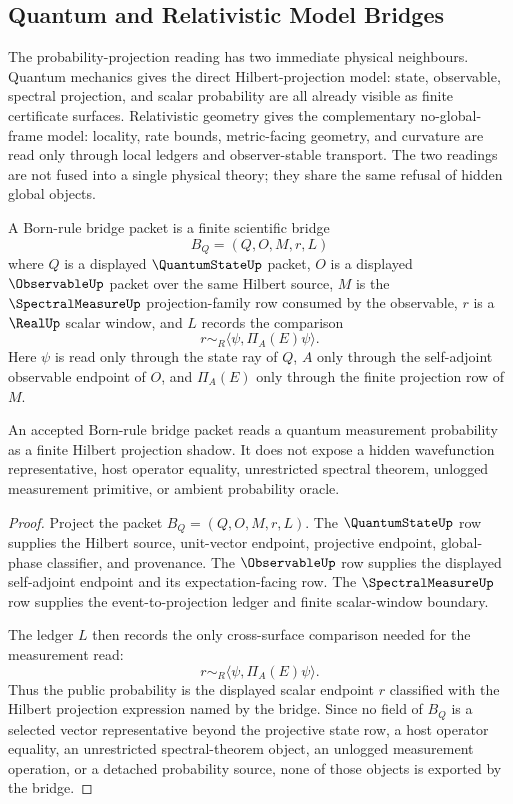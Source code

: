 \subsection{Quantum and Relativistic Model Bridges}
\label{subsec:philosophy-quantum-relativistic-model-bridge}

The probability-projection reading has two immediate physical neighbours.
Quantum mechanics gives the direct Hilbert-projection model: state, observable,
spectral projection, and scalar probability are all already visible as finite
certificate surfaces. Relativistic geometry gives the complementary
no-global-frame model: locality, rate bounds, metric-facing geometry, and
curvature are read only through local ledgers and observer-stable transport.
The two readings are not fused into a single physical theory; they share the
same refusal of hidden global objects.

\begin{definition}
\label{def:philosophy-born-rule-bridge-packet}
A Born-rule bridge packet is a finite scientific bridge
$$
B_Q=(Q,O,M,r,L)
$$
where $Q$ is a displayed $\QuantumStateUp$ packet, $O$ is a displayed
$\ObservableUp$ packet over the same Hilbert source, $M$ is the
$\SpectralMeasureUp$ projection-family row consumed by the observable, $r$ is
a $\RealUp$ scalar window, and $L$ records the comparison
$$
r\sim_R\langle \psi,\Pi_A(E)\psi\rangle .
$$
Here $\psi$ is read only through the state ray of $Q$, $A$ only through the
self-adjoint observable endpoint of $O$, and $\Pi_A(E)$ only through the
finite projection row of $M$.
\end{definition}

\begin{theorem}
\label{thm:philosophy-born-probability-certified-projection-shadow}
An accepted Born-rule bridge packet reads a quantum measurement probability
as a finite Hilbert projection shadow. It does not expose a hidden wavefunction
representative, host operator equality, unrestricted spectral theorem,
unlogged measurement primitive, or ambient probability oracle.
\end{theorem}
\begin{proof}
Project the packet $B_Q=(Q,O,M,r,L)$. The $\QuantumStateUp$ row supplies the
Hilbert source, unit-vector endpoint, projective endpoint, global-phase
classifier, and provenance. The $\ObservableUp$ row supplies the displayed
self-adjoint endpoint and its expectation-facing row. The
$\SpectralMeasureUp$ row supplies the event-to-projection ledger and finite
scalar-window boundary.

The ledger $L$ then records the only cross-surface comparison needed for the
measurement read:
$$
r\sim_R\langle \psi,\Pi_A(E)\psi\rangle .
$$
Thus the public probability is the displayed scalar endpoint $r$ classified
with the Hilbert projection expression named by the bridge. Since no field of
$B_Q$ is a selected vector representative beyond the projective state row, a
host operator equality, an unrestricted spectral-theorem object, an unlogged
measurement operation, or a detached probability source, none of those objects
is exported by the bridge.
\end{proof}

